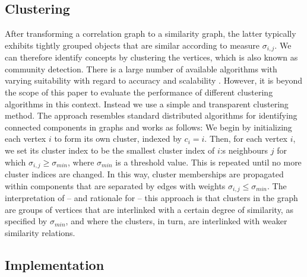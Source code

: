 \documentclass[conference]{IEEEtran}
\newcommand{\sy}[1]{\sigma_{#1}}
\begin{document}
\subsection{Clustering}
\begin{sloppypar}
After transforming a correlation graph to a similarity graph, the latter typically exhibits tightly grouped objects that are
similar according to measure $\sy{i,j}$. We can therefore identify concepts by clustering the vertices, which is
also known as community detection. There is a large number of available algorithms with
varying suitability with regard to accuracy and scalability \cite{Fortunato2010}. However, it is beyond the scope of this paper to evaluate the
performance of different clustering algorithms in this context. Instead we use a simple and transparent clustering
method. The approach resembles standard distributed algorithms for identifying connected components in graphs and works as
follows: We begin by initializing each vertex $i$ to form its own cluster, indexed by $c_i = i$. Then, for each vertex $i$, we
set its cluster index to be the smallest cluster index of $i$:s neighbours $j$ for which $\sy{i,j} \geq \sigma_{min}$, where
$\sigma_{min}$ is a threshold value. This is repeated until no more cluster indices are changed. In this way, cluster memberships
are propagated within components that are separated by edges with weights $\sy{i,j} \leq  \sigma_{min}$. The interpretation of --
and rationale for -- this approach is that clusters in the graph are groups of vertices that are interlinked with a certain
degree of similarity, as specified by $\sigma_{min}$, and where the clusters, in turn, are interlinked with weaker similarity
relations.
\end{sloppypar}

\subsection{Implementation}
\label{subsec:algorithmsAndImplementation}
\end{document}
